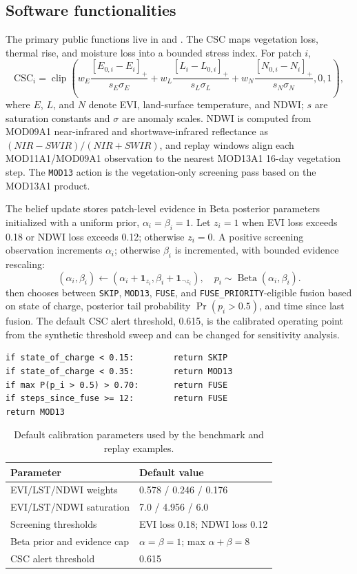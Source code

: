 \documentclass[preprint,12pt,a4paper]{elsarticle}
\begin{document}
\subsection{Software functionalities}

The primary public functions live in  and . The CSC maps vegetation loss, thermal rise, and moisture loss into a bounded stress index. For patch $i$,
\[
\mathrm{CSC}_i=\operatorname{clip}\left(
w_E\frac{[E_{0,i}-E_i]_+}{s_E\sigma_E}
+w_L\frac{[L_i-L_{0,i}]_+}{s_L\sigma_L}
+w_N\frac{[N_{0,i}-N_i]_+}{s_N\sigma_N},
0,1\right),
\]
where $E$, $L$, and $N$ denote EVI, land-surface temperature, and NDWI; $s$ are saturation constants and $\sigma$ are anomaly scales. NDWI is computed from MOD09A1 near-infrared and shortwave-infrared reflectance as $(NIR-SWIR)/(NIR+SWIR)$, and replay windows align each MOD11A1/MOD09A1 observation to the nearest MOD13A1 16-day vegetation step. The \texttt{MOD13} action is the vegetation-only screening pass based on the MOD13A1 product.

The belief update stores patch-level evidence in Beta posterior parameters initialized with a uniform prior, $\alpha_i=\beta_i=1$. Let $z_i=1$ when EVI loss exceeds 0.18 or NDWI loss exceeds 0.12; otherwise $z_i=0$. A positive screening observation increments $\alpha_i$; otherwise $\beta_i$ is incremented, with bounded evidence rescaling:
\[
(\alpha_i,\beta_i)\leftarrow(\alpha_i+\mathbf{1}_{z_i},\beta_i+\mathbf{1}_{\neg z_i}), \quad
p_i \sim \operatorname{Beta}(\alpha_i,\beta_i).
\]
 then chooses between \texttt{SKIP}, \texttt{MOD13}, \texttt{FUSE}, and \texttt{FUSE\_PRIORITY}-eligible fusion based on state of charge, posterior tail probability $\Pr(p_i>0.5)$, and time since last fusion. The default CSC alert threshold, 0.615, is the calibrated operating point from the synthetic threshold sweep and can be changed for sensitivity analysis.

\begin{verbatim}
if state_of_charge < 0.15:        return SKIP
if state_of_charge < 0.35:        return MOD13
if max P(p_i > 0.5) > 0.70:       return FUSE
if steps_since_fuse >= 12:        return FUSE
return MOD13
\end{verbatim}

\begin{table}[!h]
\centering
\small
\begin{tabular}{ll}
\toprule
Parameter & Default value \\
\midrule
EVI/LST/NDWI weights & 0.578 / 0.246 / 0.176 \\
EVI/LST/NDWI saturation & 7.0 / 4.956 / 6.0 \\
Screening thresholds & EVI loss 0.18; NDWI loss 0.12 \\
Beta prior and evidence cap & $\alpha=\beta=1$; max $\alpha+\beta=8$ \\
CSC alert threshold & 0.615 \\
\bottomrule
\end{tabular}
\caption{Default calibration parameters used by the benchmark and replay examples.}
\label{tab:calibration}
\end{table}
\end{document}
